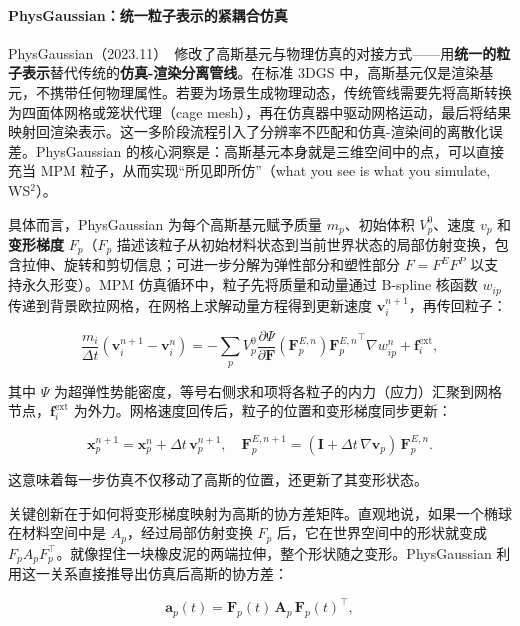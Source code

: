 \paragraph{PhysGaussian：统一粒子表示的紧耦合仿真}

PhysGaussian（2023.11）~\cite{2311_12198}修改了高斯基元与物理仿真的对接方式——用\textbf{统一的粒子表示}替代传统的\textbf{仿真-渲染分离管线}。在标准 3DGS 中，高斯基元仅是渲染基元，不携带任何物理属性。若要为场景生成物理动态，传统管线需要先将高斯转换为四面体网格或笼状代理（cage mesh），再在仿真器中驱动网格运动，最后将结果映射回渲染表示。这一多阶段流程引入了分辨率不匹配和仿真-渲染间的离散化误差。PhysGaussian 的核心洞察是：高斯基元本身就是三维空间中的点，可以直接充当 MPM 粒子，从而实现``所见即所仿''（what you see is what you simulate, WS$^2$）。

具体而言，PhysGaussian 为每个高斯基元赋予质量 $m_p$、初始体积 $V_p^0$、速度 $v_p$ 和\textbf{变形梯度} $F_p$（$F_p$ 描述该粒子从初始材料状态到当前世界状态的局部仿射变换，包含拉伸、旋转和剪切信息；可进一步分解为弹性部分和塑性部分 $F = F^E F^P$ 以支持永久形变）。MPM 仿真循环中，粒子先将质量和动量通过 B-spline 核函数 $w_{ip}$ 传递到背景欧拉网格，在网格上求解动量方程得到更新速度 $\mathbf{v}_i^{n+1}$，再传回粒子：

\begin{equation}
\frac{m_i}{\Delta t}(\mathbf{v}_i^{n+1} - \mathbf{v}_i^{n}) = -\sum_p V_p^0 \frac{\partial \Psi}{\partial \mathbf{F}}(\mathbf{F}_p^{E,n}) {\mathbf{F}_p^{E,n}}^\top \nabla w_{ip}^n + \mathbf{f}_i^{\text{ext}},
\end{equation}

其中 $\Psi$ 为超弹性势能密度，等号右侧求和项将各粒子的内力（应力）汇聚到网格节点，$\mathbf{f}_i^{\text{ext}}$ 为外力。网格速度回传后，粒子的位置和变形梯度同步更新：

\begin{equation}
\mathbf{x}_p^{n+1} = \mathbf{x}_p^n + \Delta t \, \mathbf{v}_p^{n+1}, \quad \mathbf{F}_p^{E,n+1} = (\mathbf{I} + \Delta t \, \nabla \mathbf{v}_p) \, \mathbf{F}_p^{E,n}.
\end{equation}

这意味着每一步仿真不仅移动了高斯的位置，还更新了其变形状态。

关键创新在于如何将变形梯度映射为高斯的协方差矩阵。直观地说，如果一个椭球在材料空间中是 $A_p$，经过局部仿射变换 $F_p$ 后，它在世界空间中的形状就变成 $F_p A_p F_p^\top$。就像捏住一块橡皮泥的两端拉伸，整个形状随之变形。PhysGaussian 利用这一关系直接推导出仿真后高斯的协方差：

\begin{equation}
\mathbf{a}_p(t) = \mathbf{F}_p(t) \, \mathbf{A}_p \, \mathbf{F}_p(t)^\top,
\end{equation}

